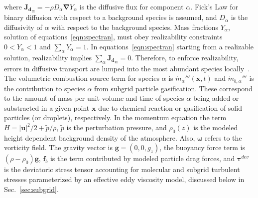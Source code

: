 \documentclass[journal,article,atmosphere,submit,moreauthors,pdftex]{Definitions/mdpi}
\begin{document}
where $\mathbf{J_{d}}_\alpha=- \rho D_\alpha \boldsymbol{\nabla} Y_\alpha$ is the diffusive flux for component $\alpha$. Fick's Law for binary diffusion with respect to a background species is assumed, and $D_\alpha$ is the diffusivity of $\alpha$ with respect to the background species.  Mass fractions $Y_\alpha$, solution of equations~\eqref{eqn:spectran}, must obey realizability constraints $0<Y_\alpha<1$ and $\sum_\alpha Y_\alpha=1$. In equations~\eqref{eqn:spectran} starting from a realizable solution, realizability implies $\sum_\alpha \mathbf{J_{d}}_\alpha = 0$. Therefore, to enforce realizability, errors in diffusive transport are lumped into the most abundant species locally~\cite{McDermott:2015}. The volumetric combustion source term for species $\alpha$ is $\dot{m}_\alpha'''(\mathbf{x},t)$  and $\dot{m}_{b,\alpha}'''$ is the contribution to species $\alpha$ from subgrid particle gasification. These correspond to the amount of mass per unit volume and time of species $\alpha$ being added or substracted in a given point $\mathbf{x}$ due to chemical reaction or gasification of solid particles (or droplets), respectively.  In the momentum equation the term $H=|\mathbf{u}|^2/2 + \tilde{p}/\rho$, $\tilde{p}$ is the perturbation pressure, and $\rho_0(z)$ is the modeled height dependent background density of the atmosphere.  Also, $\boldsymbol{\omega}$ refers to the vorticity field. The gravity vector is $\mathbf{g}=(0,0,g_z)$, the buoyancy force term is $ (\rho-\rho_0) \mathbf{g}$, $\mathbf{f}_{b}$ is the term contributed by modeled particle drag forces, and $\boldsymbol{\tau}^{dev}$ is the deviatoric stress tensor accounting for molecular and subgrid turbulent stresses parameterized by an effective eddy viscosity model, discussed below in Sec.~\ref{sec:subgrid}.
\end{document}
